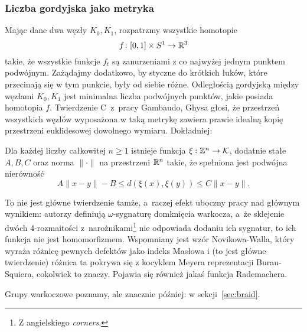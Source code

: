 
\subsubsection{Liczba gordyjska jako metryka}
Mając dane dwa węzły $K_0, K_1$, rozpatrzmy wszystkie homotopie
\begin{equation}
    f \colon [0,1] \times S^1 \to \mathbb R^3
\end{equation}
takie, że wszystkie funkcje $f_t$ są zanurzeniami z co najwyżej jednym punktem podwójnym.
Zażądajmy dodatkowo, by styczne do krótkich łuków, które przecinają się w tym punkcie, były od siebie różne.
Odległością gordyjską między węzłami $K_0, K_1$ jest minimalna liczba podwójnych punktów, jakie posiada homotopia $f$.
Twierdzenie C~z~pracy Gambaudo, Ghysa \cite{gambaudo05} głosi, że przestrzeń wszystkich węzłów wyposażona w taką metrykę zawiera prawie idealną kopię przestrzeni euklidesowej dowolnego wymiaru.
%
%
Dokładniej:

\begin{proposition}
    Dla każdej liczby całkowitej $n \ge 1$ istnieje funkcja $\xi: \mathbb Z^n \to \mathcal{K}$, dodatnie stałe $A, B, C$ oraz norma $\|\cdot\|$ na przestrzeni $\mathbb R^n$ takie, że spełniona jest podwójna nierówność
    \begin{equation}
        A\|x-y\| - B \le d(\xi(x), \xi(y)) \le C\|x-y\|.
    \end{equation}
\end{proposition}

To nie jest główne twierdzenie tamże, a~raczej efekt uboczny pracy nad głównym wynikiem: autorzy definiują $\omega$-sygnaturę domknięcia warkocza, a~że sklejenie dwóch 4-rozmaitości z~narożnikami\footnote{Z angielskiego \emph{corners}.} nie odpowiada dodaniu ich sygnatur, to ich funkcja nie jest homomorfizmem.
%
Wspomniany jest wzór Novikowa-Walla, który wyraża różnicę pewnych defektów jako indeks Masłowa i (to jest główne twierdzenie) różnica ta pokrywa się z kocyklem Meyera reprezentacji Burau-Squiera, cokolwiek to znaczy.
Pojawia się również jakaś funkcja Rademachera.

Grupy warkoczowe poznamy, ale znacznie później: w sekcji~\ref{sec:braid}.

